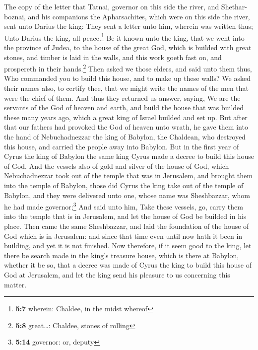  The copy of the letter that Tatnai, governor on this side
the river, and Shethar-boznai, and his companions the Apharsachites,
which were on this side the river, sent unto Darius the king:
 They sent a letter unto him, wherein was written thus;
Unto Darius the king, all peace.\footnote{\textbf{5:7} wherein: Chaldee,
  in the midst whereof}  Be it known unto the king, that
we went into the province of Judea, to the house of the great God, which
is builded with great stones, and timber is laid in the walls, and this
work goeth fast on, and prospereth in their hands.\footnote{\textbf{5:8}
  great\ldots: Chaldee, stones of rolling}  Then asked we
those elders, and said unto them thus, Who commanded you to build this
house, and to make up these walls?  We asked their names
also, to certify thee, that we might write the names of the men that
were the chief of them.  And thus they returned us
answer, saying, We are the servants of the God of heaven and earth, and
build the house that was builded these many years ago, which a great
king of Israel builded and set up.  But after that our
fathers had provoked the God of heaven unto wrath, he gave them into the
hand of Nebuchadnezzar the king of Babylon, the Chaldean, who destroyed
this house, and carried the people away into Babylon. 
But in the first year of Cyrus the king of Babylon the same king Cyrus
made a decree to build this house of God.  And the
vessels also of gold and silver of the house of God, which
Nebuchadnezzar took out of the temple that was in Jerusalem, and brought
them into the temple of Babylon, those did Cyrus the king take out of
the temple of Babylon, and they were delivered unto one, whose name was
Sheshbazzar, whom he had made governor;\footnote{\textbf{5:14} governor:
  or, deputy}  And said unto him, Take these vessels, go,
carry them into the temple that is in Jerusalem, and let the house of
God be builded in his place.  Then came the same
Sheshbazzar, and laid the foundation of the house of God which is in
Jerusalem: and since that time even until now hath it been in building,
and yet it is not finished.  Now therefore, if it seem
good to the king, let there be search made in the king's treasure house,
which is there at Babylon, whether it be so, that a decree was made of
Cyrus the king to build this house of God at Jerusalem, and let the king
send his pleasure to us concerning this matter.

